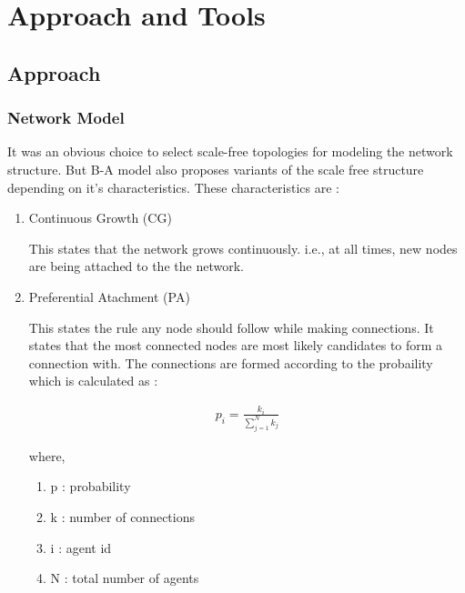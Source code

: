 
\chapter{Approach and Tools} %

\label{Chapter2} %



\section{Approach}


\subsection{Network Model}
It was an obvious choice to select scale-free topologies for modeling the network structure.  But B-A model also proposes variants of the scale free structure depending on it's characteristics. These characteristics are : 

\begin{enumerate}
\item Continuous Growth (CG)

This states that the network grows continuously. i.e., at all times, new nodes are being attached to the the network.


\item Preferential Atachment (PA)

This states the rule any node should follow while making connections. It states that the most connected nodes are most likely candidates to form a connection with.
The connections are formed according to the probaility which is calculated as :

\begin{eqnarray}
 p_i = \frac{k_i}{\sum_{j=1}^{N} k_j} 
\label{eqn:PA}
\end{eqnarray}


where, 

\begin{enumerate}
\item p : probability 
\item k : number of connections 
\item i : agent id 
\item N : total number of agents 
\end{enumerate}

\end{enumerate} 

